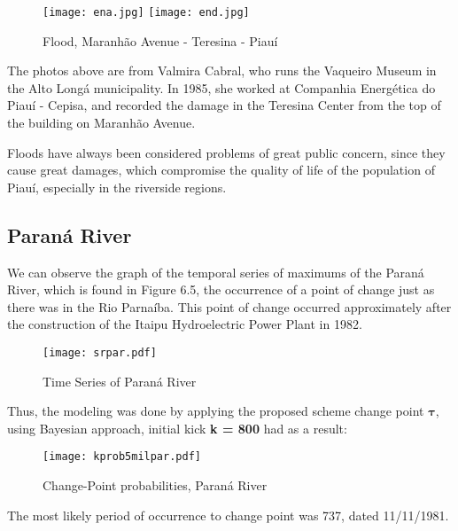 \documentclass{asaproc}
\begin{document}
\begin{figure}[H]
\caption{Flood, Maranh\~ao Avenue - Teresina - Piau\'i }
\centering
\texttt{[image: ena.jpg]}
\texttt{[image: end.jpg]}
\label{enchente}
\end{figure} 

The photos above are from Valmira Cabral, who runs the Vaqueiro Museum in the Alto Long\'a municipality. In 1985, she worked at Companhia Energética do Piau\'i - Cepisa, and recorded the damage in the Teresina Center from the top of the building on Maranh\~ao Avenue.

Floods have always been considered problems of great public concern, since they cause great damages, which compromise the quality of life of the population of Piauí, especially in the riverside regions.

\subsection{Paran\'a River}

We can observe the graph of the temporal series of maximums of the Paran\'a River, which is found in Figure 6.5, the occurrence of a point of change just as there was in the Rio Parna\'iba. This point of change occurred approximately after the construction of the Itaipu Hydroelectric Power Plant in 1982.

\begin{figure}[H]
\centering
\texttt{[image: srpar.pdf]}   
\caption{Time Series of Paraná River}
\label{parn}
\end{figure}

Thus, the modeling was done by applying the proposed scheme change point $\boldsymbol{\tau}$, using Bayesian approach, initial kick {\bf k = 800} had as a result:

\begin{figure}[H]
\centering
\texttt{[image: kprob5milpar.pdf]}   
\caption{Change-Point probabilities, Paran\'a River}
\label{ch-para}
\end{figure}

The most likely period of occurrence to change point was 737, dated 11/11/1981.
\end{document}
